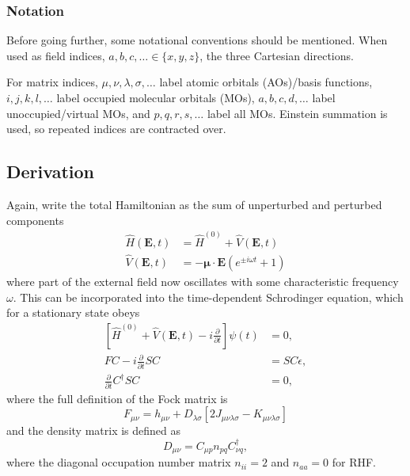 \hypertarget{notation}{%
  \subsubsection{Notation}\label{notation}}

Before going further, some notational conventions should be mentioned.  When used as field indices, \(a,b,c,\dots \in \{x,y,z\}\), the three Cartesian directions.

For matrix indices, \(\mu,\nu,\lambda,\sigma,\dots\) label atomic orbitals (AOs)/basis functions, \(i,j,k,l,\dots\) label occupied molecular orbitals (MOs), \(a,b,c,d,\dots\) label unoccupied/virtual MOs, and \(p,q,r,s,\dots\) label all MOs. Einstein summation is used, so repeated indices are contracted over.

\hypertarget{derivation}{%
  \subsection{Derivation}\label{derivation}}

Again, write the total Hamiltonian as the sum of unperturbed and perturbed components
\begin{align}
  \hat{H}(\mathbf{E},t) &= \hat{H}^{(0)} + \hat{V}(\mathbf{E},t) \\
  \hat{V}(\mathbf{E},t) &= -\mathbf{\mu} \cdot \mathbf{E}(e^{\pm i \omega t} + 1)
\end{align}
where part of the external field now oscillates with some characteristic frequency \(\omega\). This can be incorporated into the time-dependent Schrodinger equation, which for a stationary state obeys
\begin{align}
  \left[ \hat{H}^{(0)} + \hat{V}(\mathbf{E},t) - i\frac{\partial}{\partial t} \right] \psi(t) &= 0, \\
  FC - i \frac{\partial}{\partial t} SC &= SC\epsilon, \\
  \frac{\partial}{\partial t} C^{\dagger} S C &= 0,
\end{align}
where the full definition of the Fock matrix is
\begin{equation}
  F_{\mu\nu} = h_{\mu\nu} + D_{\lambda\sigma}[2J_{\mu\nu\lambda\sigma} - K_{\mu\nu\lambda\sigma}]
\end{equation}
and the density matrix is defined as
\begin{equation}
  D_{\mu\nu} = C_{\mu p}n_{pq}C_{\nu q}^{\dagger},
\end{equation}
where the diagonal occupation number matrix \(n_{ii} = 2\) and \(n_{aa} = 0\) for RHF.

